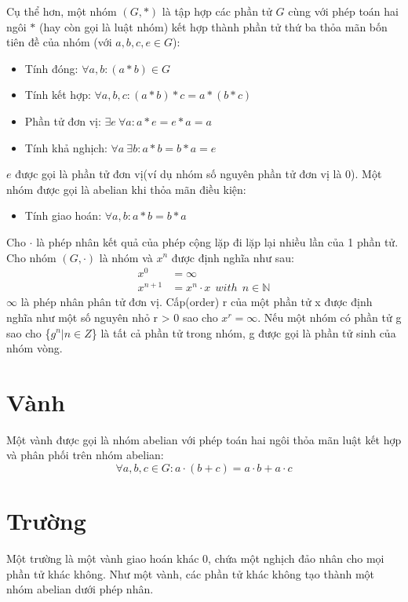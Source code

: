 \documentclass[a4paper,12pt]{report}
\begin{document}
Cụ thể hơn, một nhóm $(G, *)$ là tập hợp các phần tử $G$ cùng với phép toán hai ngôi $*$ (hay còn gọi là luật nhóm) kết hợp thành phần tử thứ ba thỏa mãn bốn tiên đề của nhóm (với $ a, b , c, e \in G$):

\begin{itemize}
\item Tính đóng: $\forall a, b: (a * b) \in G$
\item Tính kết hợp: $\forall a, b, c: (a * b) * c = a * (b * c)$
\item Phần tử đơn vị: $\exists e \ \forall a: a * e = e * a = a$
\item Tính khả nghịch: $\forall a \ \exists b: a * b = b * a = e$
\end{itemize}
$e$ được gọi là phần tử đơn vị(ví dụ nhóm số nguyên phần tử đơn vị là 0). Một nhóm được gọi là abelian  khi thỏa mãn điều kiện:
\begin{itemize}
\item Tính giao hoán: $\forall a,b: a * b = b * a$
\end{itemize}

Cho $\cdot$ là phép nhân kết quả của phép cộng lặp đi lặp lại nhiều lần của 1 phần tử. Cho nhóm $(G, \cdot)$ là nhóm và $x^n$ được định nghĩa như sau:
\begin{displaymath}
\begin{aligned}
x^0 & = \infty \\
x^{n + 1} & = x^n\cdot x \ \ with \ \ n \in \mathbb{N}
\end{aligned}
\end{displaymath}
$\infty$ là phép nhân phân tử đơn vị. Cấp(order) r của một phần tử x được định nghĩa như một số nguyên nhỏ r > 0 sao cho $x^r = \infty$. Nếu một nhóm có phần tử g sao cho \{$g^n | n \in Z$\} là tất cả phần tử trong nhóm, g được gọi là phần tử sinh của nhóm vòng.
\section{Vành}
Một vành được gọi là nhóm abelian  với phép toán hai ngôi thỏa mãn luật kết hợp và phân phối trên nhóm abelian:
\begin{displaymath}
\forall a, b, c \in G: a\cdot (b + c) = a \cdot b + a \cdot c
\end{displaymath}
\section{Trường}
Một trường là một vành giao hoán khác 0, chứa một nghịch đảo nhân cho mọi phần tử khác không. Như một vành, các phần tử khác không tạo thành một nhóm abelian dưới phép nhân.
\end{document}

